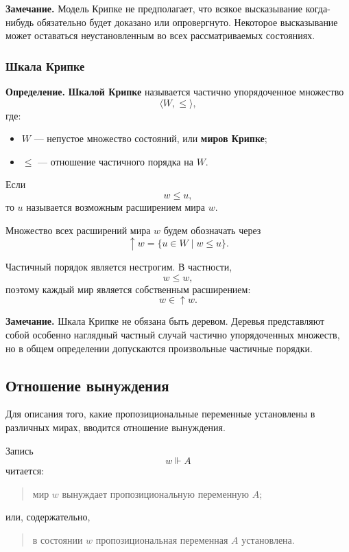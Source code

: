 \documentclass[12pt,a4paper,oneside,openany]{book}
\theoremstyle{definition}
\theoremstyle{plain}
\theoremstyle{remark}
\begin{document}
\textbf{Замечание.}
Модель Крипке не предполагает, что всякое высказывание когда-нибудь
обязательно будет доказано или опровергнуто. Некоторое высказывание
может оставаться неустановленным во всех рассматриваемых состояниях.

\subsubsection{Шкала Крипке}

\textbf{Определение.}
\textbf{Шкалой Крипке} называется частично упорядоченное множество
\[
\langle W,\leqslant\rangle,
\]
где:

\begin{itemize}
    \item \(W\) --- непустое множество состояний, или
          \textbf{миров Крипке};
    \item \(\leqslant\) --- отношение частичного порядка на \(W\).
\end{itemize}

Если
\[
w\leqslant u,
\]
то \(u\) называется возможным расширением мира \(w\).

Множество всех расширений мира \(w\) будем обозначать через
\[
{\uparrow}w
=
\{u\in W\mid w\leqslant u\}.
\]

Частичный порядок является нестрогим. В частности,
\[
w\leqslant w,
\]
поэтому каждый мир является собственным расширением:
\[
w\in{\uparrow}w.
\]

\textbf{Замечание.}
Шкала Крипке не обязана быть деревом. Деревья представляют собой
особенно наглядный частный случай частично упорядоченных множеств,
но в общем определении допускаются произвольные частичные порядки.

\subsection{Отношение вынуждения}

Для описания того, какие пропозициональные переменные установлены в
различных мирах, вводится отношение вынуждения.

Запись
\[
w\Vdash A
\]
читается:

\begin{quote}
мир \(w\) вынуждает пропозициональную переменную \(A\);
\end{quote}

или, содержательно,

\begin{quote}
в состоянии \(w\) пропозициональная переменная \(A\) установлена.
\end{quote}
\end{document}
